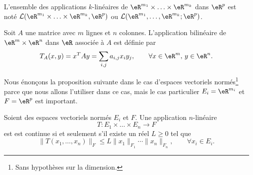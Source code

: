 L'ensemble des applications $k$-linéaires de $ \eR^{m_1}\times \ldots \times\eR^{m_k}$ dans $\eR^p$ est noté $\mathcal{L}(\eR^{m_1}\times \ldots \times\eR^{m_k}, \eR^p)$ ou $\mathcal{L}(\eR^{m_1}, \ldots,\eR^{m_k}; \eR^p)$.

\begin{example}
  Soit $A$ une matrice avec $m$ lignes et $n$ colonnes. L'application bilinéaire de $\eR^m\times \eR^n$ dans $\eR$ associée à $A$ est définie par
\[
T_A(x,y)= x^TAy=\sum_{i,j}a_{i,j}x_i y_j, \qquad \forall x\in \eR^m, \, y \in \eR^n.
\]
\end{example}

Nous énonçons la proposition suivante dans le cas d'espaces vectoriels normés\footnote{Sans hypothèses sur la dimension.} parce que nous allons l'utiliser dans ce cas, mais le cas particulier \( E_i=\eR^{m_i}\) et \( F=\eR^p\) est important.
\begin{proposition} \label{PropUADlSMg}
    Soient des espaces vectoriels normés \( E_i\) et \( F\). Une application \( n\)-linéaire
    \begin{equation}
        T\colon E_1\times\ldots\times E_n\to F
    \end{equation}
    est est continue si et seulement s'il existe un réel $L\geq 0$ tel que
  \begin{equation}\label{limitatezza}
     \|T(x_1, \ldots,x_n)\|_F\leq L \|x_1\|_{F_1}\cdots\|x_n\|_{F_n}, \qquad \forall x_i\in E_i.
  \end{equation}
\end{proposition}

